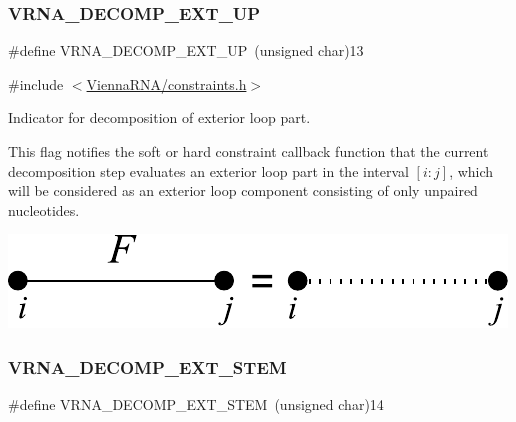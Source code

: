\subsubsection{\texorpdfstring{V\+R\+N\+A\+\_\+\+D\+E\+C\+O\+M\+P\+\_\+\+E\+X\+T\+\_\+\+UP}{VRNA\_DECOMP\_EXT\_UP}}
{\footnotesize\ttfamily \#define V\+R\+N\+A\+\_\+\+D\+E\+C\+O\+M\+P\+\_\+\+E\+X\+T\+\_\+\+UP~(unsigned char)13}



{\ttfamily \#include $<$\hyperlink{constraints_8h}{Vienna\+R\+N\+A/constraints.\+h}$>$}



Indicator for decomposition of exterior loop part. 

This flag notifies the soft or hard constraint callback function that the current decomposition step evaluates an exterior loop part in the interval $[i:j]$, which will be considered as an exterior loop component consisting of only unpaired nucleotides.

 
\begin{DoxyImageNoCaption}
  \mbox{\includegraphics[width=\textwidth,height=\textheight/2,keepaspectratio=true]{decomp_ext_up}}
\end{DoxyImageNoCaption}
 \mbox{\label{group__constraints_gae44b5ace0d9b4a29088069ecb4cec441}} 
\subsubsection{\texorpdfstring{V\+R\+N\+A\+\_\+\+D\+E\+C\+O\+M\+P\+\_\+\+E\+X\+T\+\_\+\+S\+T\+EM}{VRNA\_DECOMP\_EXT\_STEM}}
{\footnotesize\ttfamily \#define V\+R\+N\+A\+\_\+\+D\+E\+C\+O\+M\+P\+\_\+\+E\+X\+T\+\_\+\+S\+T\+EM~(unsigned char)14}



